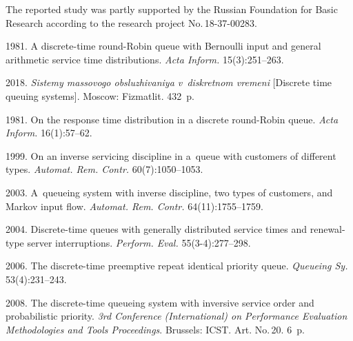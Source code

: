 

 \Ack
\noindent
The reported study was partly supported by the
Russian Foundation for Basic Research according
to the research project No.\,18-37-00283.



  \begin{multicols}{2}

\renewcommand{\bibname}{\protect\rmfamily References}

{\small\frenchspacing
 {%
 \begin{thebibliography}{99}


 1981.
A discrete-time round-Robin queue with Bernoulli input
and general arithmetic service time distributions.
\textit{Acta Inform.} 15(3):251--263.


 2018.
\textit{Sistemy massovogo obsluzhivaniya v~diskretnom vremeni}
[Discrete time queuing systems]. Moscow: Fizmatlit. 432~p.


 1981. On the 
response time distribution in a discrete round-Robin queue. 
\textit{Acta Inform.} 16(1):57--62.

 1999. On an inverse servicing discipline in 
 a~queue with customers of different types. \textit{Automat. Rem. Contr.} 
 60(7):1050--1053.

 2003. A~queueing system with inverse discipline, 
two types of customers, and Markov input flow. \textit{Automat. Rem. Contr.} 64(11):1755--1759.


 2004.
Discrete-time queues with generally distributed service times and 
renewal-type server interruptions. \textit{Perform. Eval.}  55(\mbox{3-4}):277--298. 


 2006.
The discrete-time preemptive repeat identical priority queue. 
\textit{Queueing Sy.} 53(4):231--243.

 2008. 
The discrete-time queueing system with inversive service order and probabilistic priority. 
\textit{3rd  Conference (International) on Performance Evaluation Methodologies 
and Tools Proceedings}. Brussels: ICST. Art. No.\,20. 6~p. 


\end{thebibliography}}}
\end{multicols}
